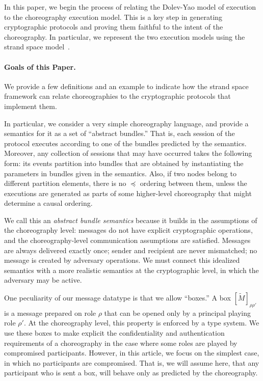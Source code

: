 \documentclass[copyright]{eptcs}
\newcommand{\msgbox}[2]{[#1]_{#2}}
\begin{document}
In this paper, we begin the process of relating the Dolev-Yao model of
execution to the choreography execution model.  This is a key step in
generating cryptographic protocols and proving them faithful to the
intent of the choreography.  In particular, we represent the two
execution models using the strand space
model~\cite{strandspaces,GuttmanEtAl05}.


\paragraph{Goals of this Paper.} We provide a few definitions and
an example to indicate how the strand space framework can relate
choreographies to the cryptographic protocols that implement them.

In particular, we consider a very simple choreography language, and
provide a semantics for it as a set of ``abstract bundles.''  That is,
each session of the protocol executes according to one of the bundles
predicted by the semantics.  Moreover, any collection of sessions that
may have occurred takes the following form: its events partition into
bundles that are obtained by instantiating the parameters in bundles
given in the semantics.  Also, if two nodes belong to different
partition elements, there is no $\preceq$ ordering between them,
unless the executions are generated as parts of some higher-level
choreography that might determine a causal ordering.

We call this an {\em abstract bundle semantics} because it builds in
the assumptions of the choreography level: messages do not have
explicit cryptographic operations, and the choreography-level
communication assumptions are satisfied.
Messages are always delivered exactly once; sender and recipient are
never mismatched; no message is created by adversary operations.  We
must connect this idealized semantics with a more realistic semantics
at the cryptographic level, in which the adversary may be active.

One peculiarity of our message datatype is that we allow ``boxes.''  A
box $\msgbox{\tilde{M}}{\rho\rho'}$ is a message prepared on role
$\rho$ that can be opened only by a principal playing role $\rho'$.
At the choreography level, this property is enforced by a type system.
We use these boxes to make explicit the confidentiality and
authentication requirements of a choreography in the case where some
roles are played by compromised participants.  However, in this
article, we focus on the simplest case, in which no participants are
compromised.  That is, we will assume here, that any participant who
is sent a box, will behave only as predicted by the choreography.
\end{document}
